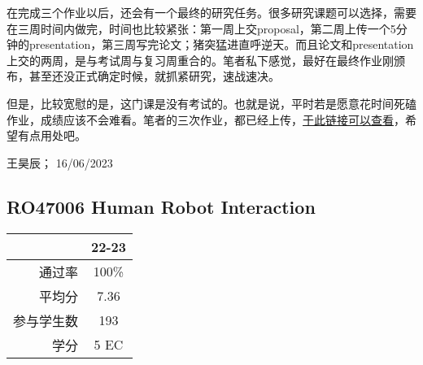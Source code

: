 在完成三个作业以后，还会有一个最终的研究任务。很多研究课题可以选择，需要在三周时间内做完，时间也比较紧张：第一周上交proposal，第二周上传一个5分钟的presentation，第三周写完论文；猪突猛进直呼逆天。而且论文和presentation上交的两周，是与考试周与复习周重合的。笔者私下感觉，最好在最终作业刚颁布，甚至还没正式确定时候，就抓紧研究，速战速决。

但是，比较宽慰的是，这门课是没有考试的。也就是说，平时若是愿意花时间死磕作业，成绩应该不会难看。笔者的三次作业，都已经上传，\href{https://drive.google.com/drive/folders/1mJun-EmYGX1DovFISP9lXZNkdnutQpuh?usp=sharing}{\uline{于此链接可以查看}}，希望有点用处吧。
\begin{flushright}
王昊辰； 16/06/2023
\end{flushright}


\subsection{RO47006 Human Robot Interaction}
\begin{minipage}{0.45\textwidth}
\centering
{}
\end{minipage}%
\begin{minipage}{0.45\textwidth}
\raggedleft
\begin{tabular}{r|c}
\textbf{ } & \textbf{22-23} \\ \hline
通过率 & 100\% \\ 
平均分 & 7.36 \\ 
参与学生数 & 193 \\ 
学分 & 5 EC\\
\end{tabular}
\end{minipage}\\

